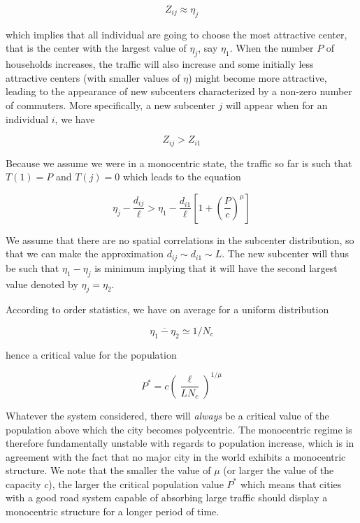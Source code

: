 $$Z_{ij}\approx \eta_j$$

which implies that all individual are going to choose the most attractive
center, that is the center with the largest value of $\eta_j$, say $\eta_1$.
When the number $P$ of households increases, the traffic will also increase and
some initially less attractive centers (with smaller values of $\eta$) might
become more attractive, leading to the appearance of new subcenters
characterized by a non-zero number of commuters. More specifically, a new
subcenter $j$ will appear when for an individual $i$, we have 

$$Z_{ij}>Z_{i1}$$

Because we assume we were in a monocentric state, the traffic so far is such
that $T(1)=P$ and $T(j)=0$ which leads to the equation

\begin{equation}
    \eta_j-\frac{d_{ij}}{\ell}>\eta_1-\frac{d_{i1}}{\ell}\left[1+\left(\frac{P}{c}\right)^\mu\right]
\end{equation}

We assume that there are no spatial correlations in the subcenter distribution,
so that we can make the approximation $d_{ij}\sim d_{i1}\sim L$. The new
subcenter will thus be such that $\eta_1-\eta_j$ is minimum implying that it
will have the second largest value denoted by $\eta_j=\eta_2$. 

According to order statistics, we have on average for a uniform distribution

$$\overline{\eta_1-\eta_2}\simeq 1/N_c$$

hence a critical value for the population

\begin{equation}
    \boxed{P^*= c \left( \frac{\ell}{L N_c} \right)^{1/\mu}}
    \label{eq:critical_population}
\end{equation}

Whatever the system considered, there will \emph{always} be a critical
value of the population above which the city becomes polycentric. The
monocentric regime is therefore fundamentally unstable with regards to
population increase, which is in agreement with the fact that no major city in
the world exhibits a monocentric structure. We note that the smaller the value
of $\mu$ (or larger the value of the capacity $c$), the larger the critical
population value $P^*$ which means that cities with a good road system capable
of absorbing large traffic should display a monocentric structure for a longer
period of time.

